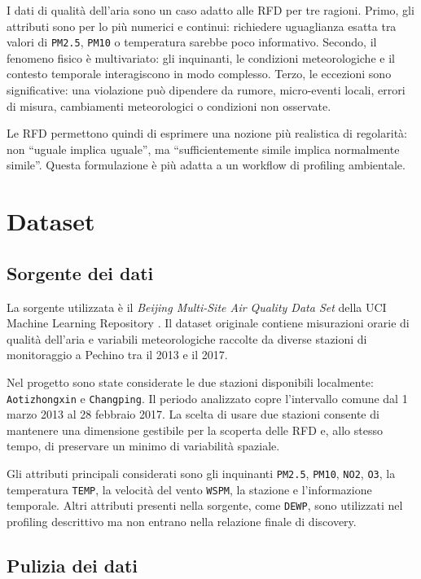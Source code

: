 \documentclass[a4paper,12pt]{article}
\newcommand{\PMdue}{\texttt{PM2.5}}
\newcommand{\PMdieci}{\texttt{PM10}}
\newcommand{\NOdue}{\texttt{NO2}}
\newcommand{\Otre}{\texttt{O3}}
\newcommand{\Temp}{\texttt{TEMP}}
\newcommand{\Wspm}{\texttt{WSPM}}
\begin{document}
I dati di qualità dell'aria sono un caso adatto alle RFD per tre ragioni. Primo, gli attributi sono per lo più numerici e continui: richiedere uguaglianza esatta tra valori di \PMdue, \PMdieci{} o temperatura sarebbe poco informativo. Secondo, il fenomeno fisico è multivariato: gli inquinanti, le condizioni meteorologiche e il contesto temporale interagiscono in modo complesso. Terzo, le eccezioni sono significative: una violazione può dipendere da rumore, micro-eventi locali, errori di misura, cambiamenti meteorologici o condizioni non osservate.

Le RFD permettono quindi di esprimere una nozione più realistica di regolarità: non ``uguale implica uguale'', ma ``sufficientemente simile implica normalmente simile''. Questa formulazione è più adatta a un workflow di profiling ambientale.

\section{Dataset}

\subsection{Sorgente dei dati}

La sorgente utilizzata è il \textit{Beijing Multi-Site Air Quality Data Set} della UCI Machine Learning Repository \cite{uci}. Il dataset originale contiene misurazioni orarie di qualità dell'aria e variabili meteorologiche raccolte da diverse stazioni di monitoraggio a Pechino tra il 2013 e il 2017.

Nel progetto sono state considerate le due stazioni disponibili localmente: \texttt{Aotizhongxin} e \texttt{Changping}. Il periodo analizzato copre l'intervallo comune dal 1 marzo 2013 al 28 febbraio 2017. La scelta di usare due stazioni consente di mantenere una dimensione gestibile per la scoperta delle RFD e, allo stesso tempo, di preservare un minimo di variabilità spaziale.

Gli attributi principali considerati sono gli inquinanti \PMdue, \PMdieci, \NOdue, \Otre, la temperatura \Temp, la velocità del vento \Wspm, la stazione e l'informazione temporale. Altri attributi presenti nella sorgente, come \texttt{DEWP}, sono utilizzati nel profiling descrittivo ma non entrano nella relazione finale di discovery.

\subsection{Pulizia dei dati}
\end{document}
